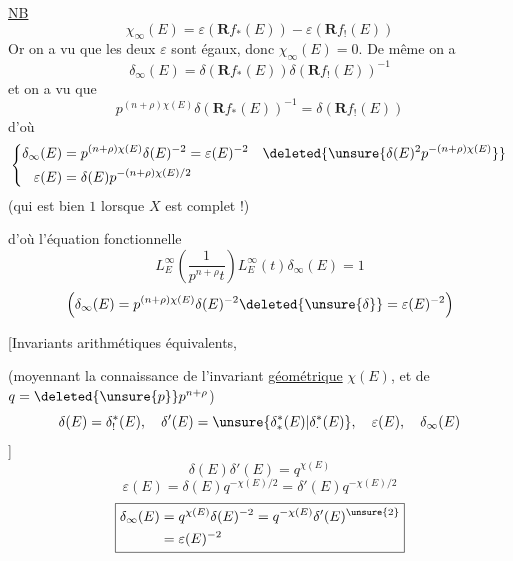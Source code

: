 \uline{NB}
\[\chi_\infty(E)=\varepsilon(\mathbf R f_*(E))-\varepsilon(\mathbf R f_!(E))\]
Or on a vu que les deux $\varepsilon$ sont égaux, donc $\chi_\infty(E)=0$. De même on a
\[\delta_\infty(E)=\delta(\mathbf R f_*(E))\delta(\mathbf R f_!(E))^{-1}\]
et on a vu que
\[p^{(n+\rho)\chi(E)}\delta(\mathbf R f_*(E))^{-1}=\delta(\mathbf R f_!(E))\]
d'où
\[\left\{\begin{aligned}
\delta_\infty(E)&=p^{(n+\rho)\chi(E)}\delta(E)^{-2}=\varepsilon(E)^{-2}\quad\deleted{\unsure{\delta(E)^2p^{-(n+\rho)\chi(E)}}}\\
\varepsilon(E)&=\delta(E)p^{-(n+\rho)\chi(E)/2}
\end{aligned}\right.\]
(qui est bien $1$ lorsque $X$ est complet !)

d'où l'équation fonctionnelle
\[\boxed{L_E^\infty\left(\frac1{p^{n+\rho}t}\right)L_E^\infty(t)\delta_\infty(E)=1}\]
\[\left(\delta_\infty(E)=p^{(n+\rho)\chi(E)}\delta(E)^{-2}\deleted{\unsure{\delta}}=\varepsilon(E)^{-2}\right)\]

[Invariants arithmétiques équivalents,

(moyennant la connaissance de l'invariant \uline{géométrique} $\chi(E)$, et de $q=\deleted{\unsure{p}}p^{n+\rho}$)
\[\delta(E)=\delta_!^*(E),\quad\delta'(E)=\unsure{\delta_*^*(E)|\delta_\cdot^*(E)},\quad\varepsilon(E),\quad\delta_\infty(E)\]
]
\[\boxed{\delta(E)\delta'(E)=q^{\chi(E)}}\]
\[\boxed{\varepsilon(E)=\delta(E)q^{-\chi(E)/2}=\delta'(E)q^{-\chi(E)/2}}\]
\[\boxed{\begin{aligned}
\delta_\infty(E)&=q^{\chi(E)}\delta(E)^{-2}=q^{-\chi(E)}\delta'(E)^{\unsure{2}}\\
&=\varepsilon(E)^{-2}
\end{aligned}}\]
